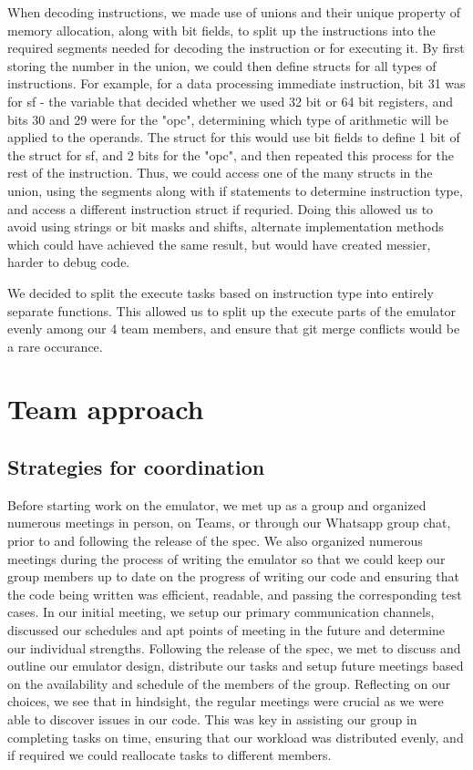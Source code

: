 \documentclass[11pt, a4paper]{article}
\begin{document}
  When decoding instructions, we made use of unions and their unique property of memory allocation, along with bit fields, to split up the instructions into the required segments needed for decoding the instruction or for executing it. By first storing the number in the union, we could then define structs for all types of instructions. For example, for a data processing immediate instruction, bit 31 was for sf - the variable that decided whether we used 32 bit or 64 bit registers, and bits 30 and 29 were for the "opc", determining which type of arithmetic will be applied to the operands. The struct for this would use bit fields to define 1 bit of the struct for sf, and 2 bits for the "opc", and then repeated this process for the rest of the instruction. Thus, we could access one of the many structs in the union, using the segments along with if statements to determine instruction type, and access a different instruction struct if requried. Doing this allowed us to avoid using strings or bit masks and shifts, alternate implementation methods which could have achieved the same result, but would have created messier, harder to debug code.
  
  We decided to split the execute tasks based on instruction type into entirely separate functions. This allowed us to split up the execute parts of the emulator evenly among our 4 team members, and ensure that git merge conflicts would be a rare occurance.
  \vspace{-0.5cm}
  \section{Team approach}
  \subsection{Strategies for coordination}
  Before starting work on the emulator, we met up as a group and organized numerous meetings in person, on Teams, or through our Whatsapp group chat, prior to and following the release of the spec. We also organized numerous meetings during the process of writing the emulator so that we could keep our group members up to date on the progress of writing our code and ensuring that the code being written was efficient, readable, and passing the corresponding test cases. In our initial meeting, we setup our primary communication channels, discussed our schedules and apt points of meeting in the future and determine our individual strengths. Following the release of the spec, we met to discuss and outline our emulator design, distribute our tasks and setup future meetings based on the availability and schedule of the members of the group. Reflecting on our choices, we see that in hindsight, the regular meetings were crucial as we were able to discover issues in our code. This was key in assisting our group in completing tasks on time, ensuring that our workload was distributed evenly, and if required we could reallocate tasks to different members.
\end{document}
